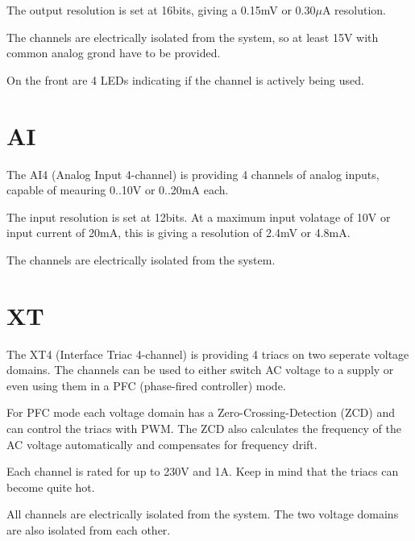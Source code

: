 The output resolution is set at 16bits, giving a 0.15mV or 0.30$\mu$A resolution. 

The channels are electrically isolated from the system, so at least 15V with common analog grond have to be provided.

On the front are 4 LEDs indicating if the channel is actively being used. 


\section{AI}
The AI4 (Analog Input 4-channel) is providing 4 channels of analog inputs, capable of meauring 0..10V or 0..20mA each. 

The input resolution is set at 12bits. At a maximum input volatage of 10V or input current of 20mA, this is giving a resolution of 2.4mV or 4.8mA.

The channels are electrically isolated from the system.


\section{XT}
The XT4 (Interface Triac 4-channel) is providing 4 triacs on two seperate voltage domains. The channels can be used to either switch AC voltage to a supply or even using them in a PFC (phase-fired controller) mode. 

For PFC mode each voltage domain has a Zero-Crossing-Detection (ZCD) and can control the triacs with PWM. The ZCD also calculates the frequency of the AC voltage automatically and compensates for frequency drift. 

Each channel is rated for up to 230V and 1A. Keep in mind that the triacs can become quite hot. 

All channels are electrically isolated from the system. The two voltage domains are also isolated from each other. 